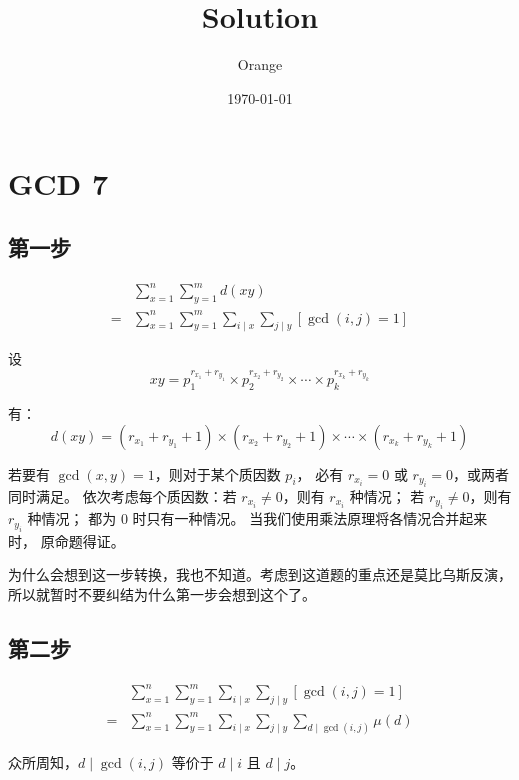 \documentclass[UTF8]{article}
\title{Solution}
\author{Orange}
\date{\today}
\begin{document}
	\heiti

	\section{GCD 7}

	\subsection{第一步}

	\begin{align*}&
		\sum_{x = 1}^{n} \sum_{y = 1}^{m} d(xy)
		\\=&
		\sum_{x = 1}^{n} \sum_{y = 1}^{m}
		\sum_{i \mid x} \sum_{j \mid y} [\gcd(i, j) = 1]
	\end{align*}


	设
	$$
	xy =
	p_{1}^{r_{x_1} + r_{y_1}} \times
	p_{2}^{r_{x_2} + r_{y_2}} \times
	\cdots \times
	p_{k}^{r_{x_k} + r_{y_k}}
	$$

	有：
	$$
	d(xy) =
	(r_{x_1} + r_{y_1} + 1) \times
	(r_{x_2} + r_{y_2} + 1) \times
	\cdots \times
	(r_{x_k} + r_{y_k} + 1)
	$$

	若要有 $\gcd(x, y) = 1$，则对于某个质因数 $p_i$，
	必有 $r_{x_i} = 0$ 或 $r_{y_i} = 0$，或两者同时满足。
	依次考虑每个质因数：若 $r_{x_i} \ne 0$，则有 $r_{x_i}$ 种情况；
	若 $r_{y_i} \ne 0$，则有 $r_{y_i}$ 种情况；
	都为 $0$ 时只有一种情况。
	当我们使用乘法原理将各情况合并起来时，
	原命题得证。

	\bigskip
	为什么会想到这一步转换，我也不知道。考虑到这道题的重点还是莫比乌斯反演，
	所以就暂时不要纠结为什么第一步会想到这个了。

	\subsection{第二步}

	\begin{align*}&
		\sum_{x = 1}^{n} \sum_{y = 1}^{m}
		\sum_{i \mid x} \sum_{j \mid y} [\gcd(i, j) = 1]
		\\=&
		\sum_{x = 1}^{n} \sum_{y = 1}^{m}
		\sum_{i \mid x} \sum_{j \mid y}
		\sum_{d \mid \gcd(i, j)} \mu(d)
	\end{align*}

	众所周知，$d \mid \gcd(i, j)$ 等价于 $d \mid i$ 且 $d \mid j$。
\end{document}
